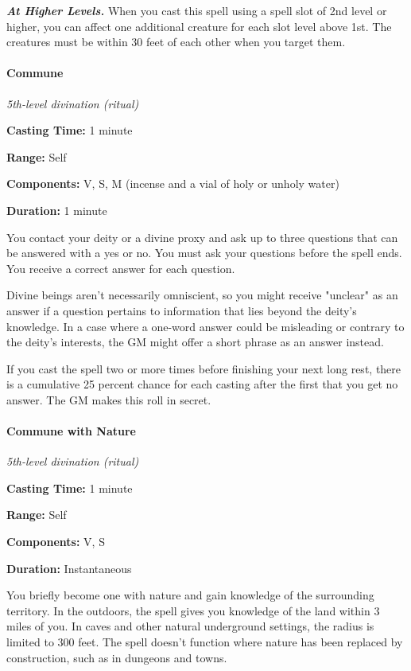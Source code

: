 \documentclass[
]{article}
\begin{document}
\emph{\textbf{At Higher Levels.}} When you cast this spell using a spell
slot of 2nd level or higher, you can affect one additional creature for
each slot level above 1st. The creatures must be within 30 feet of each
other when you target them.

\hypertarget{commune}{%
\paragraph{Commune}\label{commune}}

\emph{5th-level divination (ritual)}

\textbf{Casting Time:} 1 minute

\textbf{Range:} Self

\textbf{Components:} V, S, M (incense and a vial of holy or unholy
water)

\textbf{Duration:} 1 minute

You contact your deity or a divine proxy and ask up to three questions
that can be answered with a yes or no. You must ask your questions
before the spell ends. You receive a correct answer for each question.

Divine beings aren't necessarily omniscient, so you might receive
"unclear" as an answer if a question pertains to information that lies
beyond the deity's knowledge. In a case where a one-word answer could be
misleading or contrary to the deity's interests, the GM might offer a
short phrase as an answer instead.

If you cast the spell two or more times before finishing your next long
rest, there is a cumulative 25 percent chance for each casting after the
first that you get no answer. The GM makes this roll in secret.

\hypertarget{commune-with-nature}{%
\paragraph{Commune with Nature}\label{commune-with-nature}}

\emph{5th-level divination (ritual)}

\textbf{Casting Time:} 1 minute

\textbf{Range:} Self

\textbf{Components:} V, S

\textbf{Duration:} Instantaneous

You briefly become one with nature and gain knowledge of the surrounding
territory. In the outdoors, the spell gives you knowledge of the land
within 3 miles of you. In caves and other natural underground settings,
the radius is limited to 300 feet. The spell doesn't function where
nature has been replaced by construction, such as in dungeons and towns.
\end{document}
